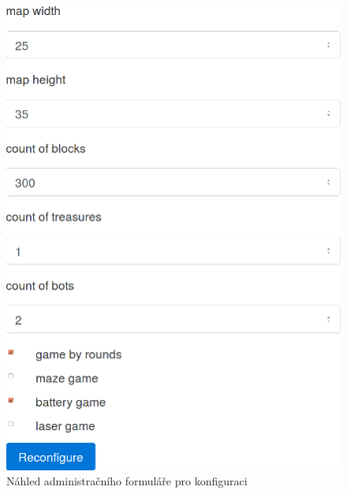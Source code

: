 \begin{figure}[H]
	\centering
	\includegraphics{assets/admin-conf-form}
	\caption{Náhled administračního formuláře pro konfiguraci}
	\label{fig:admin-conf-form}
\end{figure}
